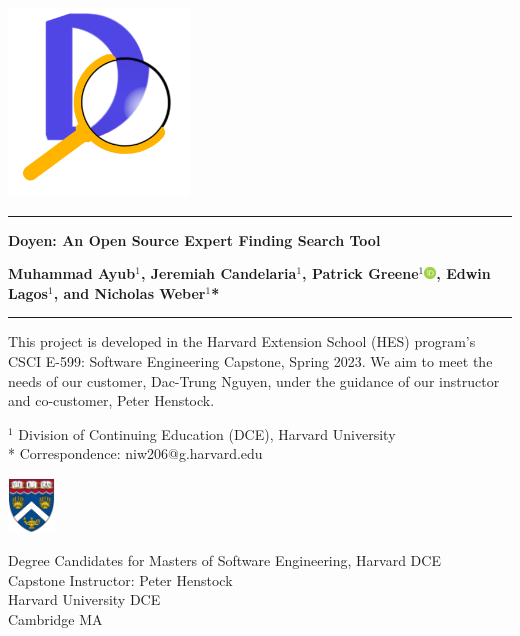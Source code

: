 \begin{titlepage}
    \def\defaultparindent{\parindent}
    \setlength{\parindent}{0cm}

    \begin{center}
        \includegraphics[keepaspectratio,height=5cm]{Images/doyen-logo-new.png}\label{fig:doyen}
    \end{center}

    \hrule
    \begin{tcolorbox}[colback=doyen-primary-dark]
    \color{white}
    \vspace*{1cm}
    \Large
    \textbf{Doyen: An Open Source Expert Finding Search Tool}
    \vspace{0.8cm}
    
    \normalsize

    \textbf{Muhammad Ayub$^{1}$, Jeremiah Candelaria$^{1}$, Patrick Greene$^{1}$\href{https://orcid.org/0000-0001-7052-0608}{\includegraphics[width=0.32cm]{Images/logo-orcid.pdf}}, Edwin Lagos$^{1}$, and Nicholas Weber$^{1}$*}
    \vspace{0.8cm}
    \end{tcolorbox}
    \hrule
    \vspace{1.5cm}
    
    This project is developed in the Harvard Extension School (HES) program's CSCI E-599: Software Engineering Capstone, Spring 2023. We aim to meet the needs of our customer, Dac-Trung Nguyen, under the guidance of our instructor and co-customer, Peter Henstock.
 
    \vspace{0.8cm}
    
    $^{1}$ Division of Continuing Education (DCE), Harvard University \\
    * Correspondence: niw206@g.harvard.edu

    \begin{center}
        \includegraphics[keepaspectratio,height=1.45cm]{Images/hes-logo.png}\label{fig:hes}
    \end{center}

    \vfill

    Degree Candidates for Masters of Software Engineering, Harvard DCE\\
    Capstone Instructor: Peter Henstock\\
    Harvard University DCE\\
    Cambridge MA\\
    \date{\today}

    \setlength{\parindent}{\defaultparindent}

\end{titlepage}